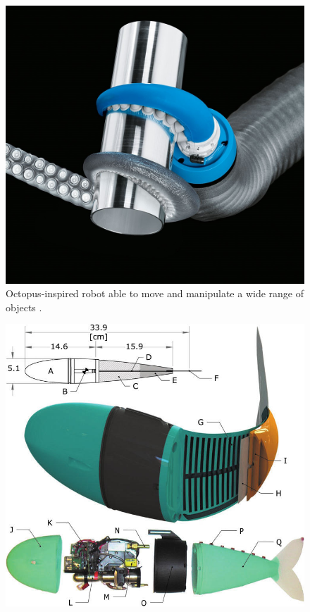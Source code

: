   \begin{minipage}{\linewidth}
      \centering
      \begin{minipage}{0.44\linewidth}
          \begin{figure}[H]
              \includegraphics[width=\linewidth]{Figures/tentaclegripper (2).jpg}
              \caption{Octopus-inspired robot able to move and manipulate a wide range of objects \cite{octopus}.}
          \end{figure}
      \end{minipage}
      \hspace{0.05\linewidth}
      \begin{minipage}{0.44\linewidth}
          \begin{figure}[H]
              \includegraphics[width=\linewidth]{Figures/fish.jpg}

\end{figure}
\end{minipage}
\end{minipage}
